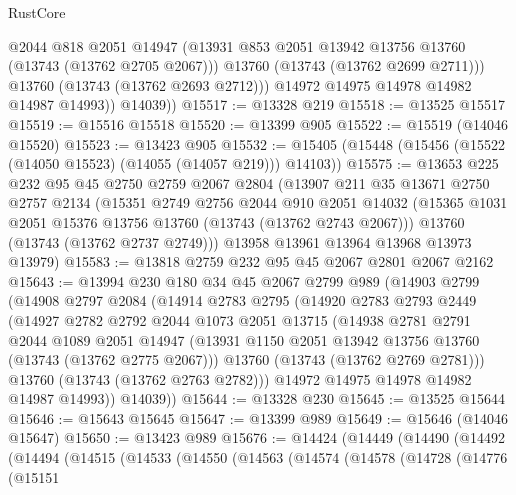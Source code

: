\begin{lexlean}{RustCore}
\begin{coremodule}
                @2044
                @818
                @2051
                @14947
                (@13931 @853 @2051 @13942 @13756 @13760 (@13743 (@13762 @2705 @2067)))
                @13760
                (@13743 (@13762 @2699 @2711)))
              @13760
              (@13743 (@13762 @2693 @2712)))
            @14972
            @14975
            @14978
            @14982
            @14987
            @14993))
        @14039))
@15517 := @13328 @219
@15518 := @13525 @15517
@15519 := @15516 @15518
@15520 := @13399 @905
@15522 := @15519 (@14046 @15520)
@15523 := @13423 @905
@15532 := @15405 (@15448 (@15456 (@15522 (@14050 @15523) (@14055 (@14057 @219))) @14103))
@15575 := @13653
    @225
    @232
    @95
    @45
    @2750
    @2759
    @2067
    @2804
    (@13907
      @211
      @35
      @13671
      @2750
      @2757
      @2134
      (@15351
        @2749
        @2756
        @2044
        @910
        @2051
        @14032
        (@15365 @1031 @2051 @15376 @13756 @13760 (@13743 (@13762 @2743 @2067)))
        @13760
        (@13743 (@13762 @2737 @2749)))
      @13958
      @13961
      @13964
      @13968
      @13973
      @13979)
@15583 := @13818 @2759 @232 @95 @45 @2067 @2801 @2067 @2162
@15643 := @13994
    @230
    @180
    @34
    @45
    @2067
    @2799
    @989
    (@14903
      @2799
      (@14908
        @2797
        @2084
        (@14914
          @2783
          @2795
          (@14920
            @2783
            @2793
            @2449
            (@14927
              @2782
              @2792
              @2044
              @1073
              @2051
              @13715
              (@14938
                @2781
                @2791
                @2044
                @1089
                @2051
                @14947
                (@13931 @1150 @2051 @13942 @13756 @13760 (@13743 (@13762 @2775 @2067)))
                @13760
                (@13743 (@13762 @2769 @2781)))
              @13760
              (@13743 (@13762 @2763 @2782)))
            @14972
            @14975
            @14978
            @14982
            @14987
            @14993))
        @14039))
@15644 := @13328 @230
@15645 := @13525 @15644
@15646 := @15643 @15645
@15647 := @13399 @989
@15649 := @15646 (@14046 @15647)
@15650 := @13423 @989
@15676 := @14424
    (@14449
      (@14490
        (@14492
          (@14494
            (@14515
              (@14533
                (@14550
                  (@14563
                    (@14574
                      (@14578
                        (@14728
                          (@14776
                            (@15151

\end{coremodule}
\end{lexlean}

